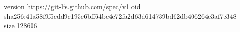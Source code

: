 version https://git-lfs.github.com/spec/v1
oid sha256:41a58f9f5cdd9c193e6bff64be4c72fa2d63d614739bd62db406264c3af7e348
size 128606
